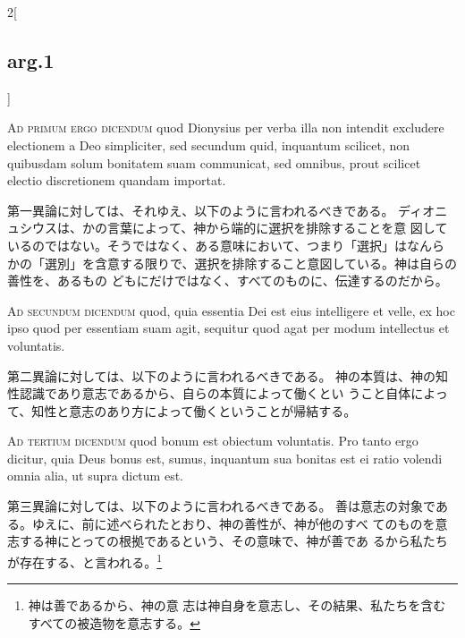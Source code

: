 \documentclass[paper=a4paper,fontsize=10pt,jafontsize=9pt,titlepage]{jlreq}
\begin{document}
\begin{paracol}{2}[\subsection{arg.1}]
\switchcolumn*[\subsection{ad.1}]


{\scshape Ad primum ergo dicendum} quod Dionysius per
 verba illa non intendit excludere electionem a Deo simpliciter, sed
 secundum quid, inquantum scilicet, non quibusdam solum bonitatem suam
 communicat, sed omnibus, prout scilicet electio discretionem quandam
 importat.

\switchcolumn

第一異論に対しては、それゆえ、以下のように言われるべきである。
ディオニュシウスは、かの言葉によって、神から端的に選択を排除することを意
 図しているのではない。そうではなく、ある意味において、つまり「選択」はなんら
 かの「選別」を含意する限りで、選択を排除すること意図している。神は自らの善性を、あるもの
 どもにだけではなく、すべてのものに、伝達するのだから。

\switchcolumn*[\subsection{ad.2}]


{\scshape Ad secundum dicendum} quod, quia essentia Dei
 est eius intelligere et velle, ex hoc ipso quod per essentiam suam
 agit, sequitur quod agat per modum intellectus et voluntatis.

\switchcolumn

第二異論に対しては、以下のように言われるべきである。
神の本質は、神の知性認識であり意志であるから、自らの本質によって働くとい
 うこと自体によって、知性と意志のあり方によって働くということが帰結する。

\switchcolumn*[\subsection{ad.3}]


{\scshape Ad tertium dicendum} quod bonum est obiectum
 voluntatis. Pro tanto ergo dicitur, quia Deus bonus est, sumus,
 inquantum sua bonitas est ei ratio volendi omnia alia, ut supra dictum
 est.

\switchcolumn

第三異論に対しては、以下のように言われるべきである。
善は意志の対象である。ゆえに、前に述べられたとおり、神の善性が、神が他のすべ
 てのものを意志する神にとっての根拠であるという、その意味で、神が善であ
 るから私たちが存在する、と言われる。\footnote{神は善であるから、神の意
 志は神自身を意志し、その結果、私たちを含むすべての被造物を意志する。}


\end{paracol}
\end{document}
